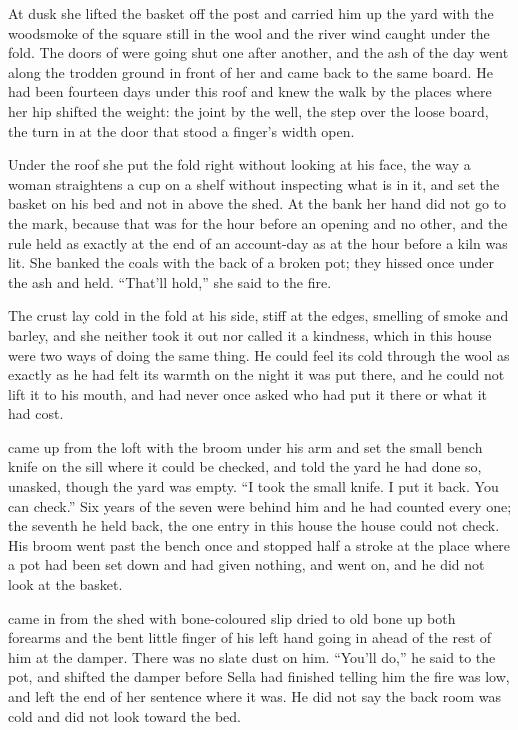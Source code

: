 \scenebreak

At dusk she lifted the basket off the post and carried him up the yard with the woodsmoke of the square still in the wool and the river wind caught under the fold. The doors of  were going shut one after another, and the ash of the day went along the trodden ground in front of her and came back to the same board. He had been fourteen days under this roof and knew the walk by the places where her hip shifted the weight: the joint by the well, the step over the loose board, the turn in at the door that stood a finger's width open.

Under the roof she put the fold right without looking at his face, the way a woman straightens a cup on a shelf without inspecting what is in it, and set the basket on his bed and not in  above the shed. At the bank her hand did not go to the mark, because that was for the hour before an opening and no other, and the rule held as exactly at the end of an account-day as at the hour before a kiln was lit. She banked the coals with the back of a broken pot; they hissed once under the ash and held. “That'll hold,” she said to the fire.

The crust lay cold in the fold at his side, stiff at the edges, smelling of smoke and barley, and she neither took it out nor called it a kindness, which in this house were two ways of doing the same thing. He could feel its cold through the wool as exactly as he had felt its warmth on the night it was put there, and he could not lift it to his mouth, and had never once asked who had put it there or what it had cost.

 came up from the loft with the broom under his arm and set the small bench knife on the sill where it could be checked, and told the yard he had done so, unasked, though the yard was empty. “I took the small knife. I put it back. You can check.” Six years of the seven were behind him and he had counted every one; the seventh he held back, the one entry in this house the house could not check. His broom went past the bench once and stopped half a stroke at the place where a pot had been set down and had given nothing, and went on, and he did not look at the basket.

 came in from the shed with bone-coloured slip dried to old bone up both forearms and the bent little finger of his left hand going in ahead of the rest of him at the damper. There was no slate dust on him. “You'll do,” he said to the pot, and shifted the damper before Sella had finished telling him the fire was low, and left the end of her sentence where it was. He did not say the back room was cold and did not look toward the bed.

